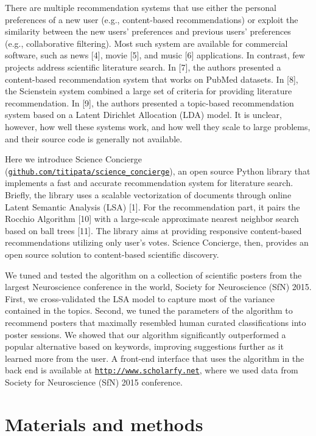 \documentclass[a4paper]{article}
\begin{document}
There are multiple recommendation systems that use either the personal preferences of a new user (e.g., content-based recommendations) or exploit the similarity between the new users’ preferences and previous users’ preferences (e.g., collaborative filtering). Most such system are available for commercial software, such as news [4], movie [5], and music [6] applications. In contrast, few projects address scientific literature search. In [7], the authors presented a content-based recommendation system that works on PubMed datasets. In [8], the Scienstein system combined a large set of criteria for providing literature recommendation. In [9], the authors presented a topic-based recommendation system based on a Latent Dirichlet Allocation (LDA) model. It is unclear, however, how well these systems work, and how well they scale to large problems, and their source code is generally not available.


Here we introduce Science Concierge (\href{https://github.com/titipata/science_concierge}{\texttt{github.com/titipata/science\_concierge}}), an open source Python library that implements a fast and accurate recommendation system for literature search. Briefly, the library uses a scalable vectorization of documents through online Latent Semantic Analysis (LSA) [1]. For the recommendation part, it pairs the Rocchio Algorithm [10] with a large-scale approximate nearest neighbor search based on ball trees [11]. The library aims at providing responsive content-based recommendations utilizing only user’s votes. Science Concierge, then, provides an open source solution to content-based scientific discovery.


We tuned and tested the algorithm on a collection of scientific posters from the largest Neuroscience conference in the world, Society for Neuroscience (SfN) 2015. First, we cross-validated the LSA model to capture most of the variance contained in the topics. Second, we tuned the parameters of the algorithm to recommend posters that maximally resembled human curated classifications into poster sessions. We showed that our algorithm significantly outperformed a popular alternative based on keywords, improving suggestions further as it learned more from the user. A front-end interface that uses the algorithm in the back end is available at \href{http://www.scholarfy.net}{\texttt{http://www.scholarfy.net}}, where we used data from Society for Neuroscience (SfN) 2015 conference.

\section{Materials and methods}
\end{document}
